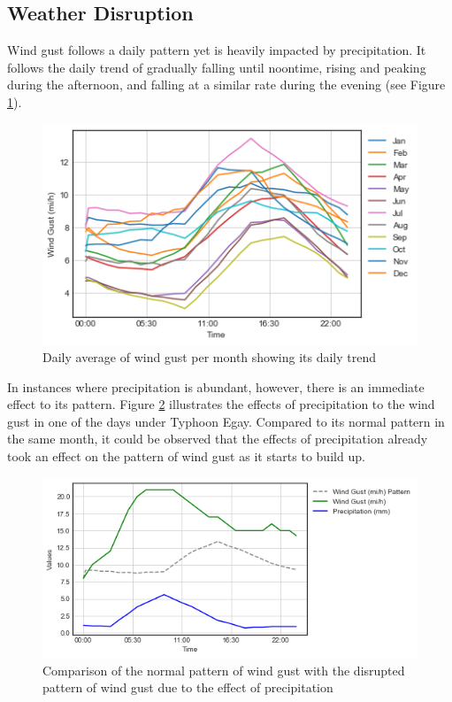 \subsection{Weather Disruption}

Wind gust follows a daily pattern yet is heavily impacted by precipitation. It follows the daily trend of gradually falling until noontime, rising and peaking during the afternoon, and falling at a similar rate during the evening (see Figure \ref{figure_windgust}).



\begin{figure}
  \includegraphics[width=\linewidth]{figures/figure_windgust.png}
  \caption{Daily average of wind gust per month showing its daily trend}
  \label{figure_windgust}
\end{figure}


In instances where precipitation is abundant, however, there is an immediate effect to its pattern. Figure \ref{figure_precip_windgust} illustrates the effects of precipitation to the wind gust in one of the days under Typhoon Egay. Compared to its normal pattern in the same month, it could be observed that the effects of precipitation already took an effect on the pattern of wind gust as it starts to build up.


\begin{figure}
  \includegraphics[width=\linewidth]{figures/figure_precip_windgust.png}
  \caption{Comparison of the normal pattern of wind gust with the disrupted pattern of wind gust due to the effect of precipitation}
  \label{figure_precip_windgust}
\end{figure}


